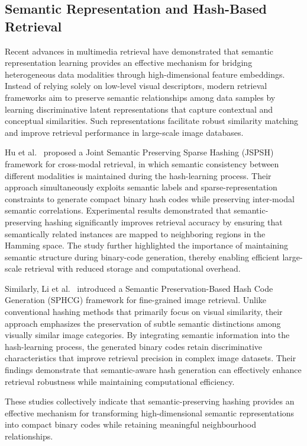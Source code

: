 \documentclass[11pt]{article}
\theoremstyle{definition}
\begin{document}
\subsection{Semantic Representation and Hash-Based Retrieval}
Recent advances in multimedia retrieval have demonstrated that semantic
representation learning provides an effective mechanism for bridging heterogeneous
data modalities through high-dimensional feature embeddings. Instead of relying
solely on low-level visual descriptors, modern retrieval frameworks aim to preserve
semantic relationships among data samples by learning discriminative latent
representations that capture contextual and conceptual similarities. Such
representations facilitate robust similarity matching and improve retrieval
performance in large-scale image databases.

Hu et al.\ \cite{huJSPSH} proposed a Joint Semantic Preserving Sparse Hashing (JSPSH) framework
for cross-modal retrieval, in which semantic consistency between different
modalities is maintained during the hash-learning process. Their approach
simultaneously exploits semantic labels and sparse-representation constraints to
generate compact binary hash codes while preserving inter-modal semantic
correlations. Experimental results demonstrated that semantic-preserving hashing
significantly improves retrieval accuracy by ensuring that semantically related
instances are mapped to neighboring regions in the Hamming space. The study further
highlighted the importance of maintaining semantic structure during binary-code
generation, thereby enabling efficient large-scale retrieval with reduced storage
and computational overhead.

Similarly, Li et al.\ \cite{liSPHCG} introduced a Semantic Preservation-Based Hash Code
Generation (SPHCG) framework for fine-grained image retrieval. Unlike conventional
hashing methods that primarily focus on visual similarity, their approach emphasizes
the preservation of subtle semantic distinctions among visually similar image
categories. By integrating semantic information into the hash-learning process, the
generated binary codes retain discriminative characteristics that improve retrieval
precision in complex image datasets. Their findings demonstrate that semantic-aware
hash generation can effectively enhance retrieval robustness while maintaining
computational efficiency.

These studies collectively indicate that semantic-preserving hashing provides an
effective mechanism for transforming high-dimensional semantic representations into
compact binary codes while retaining meaningful neighbourhood relationships.
\end{document}
